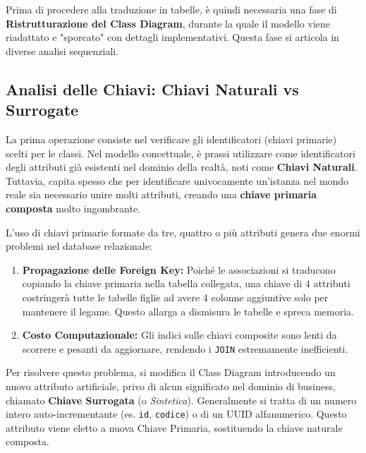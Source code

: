 Prima di procedere alla traduzione in tabelle, è quindi necessaria una fase di \textbf{Ristrutturazione del Class Diagram}, durante la quale il modello viene riadattato e "sporcato" con dettagli implementativi. Questa fase si articola in diverse analisi sequenziali.

\subsection{Analisi delle Chiavi: Chiavi Naturali vs Surrogate}

La prima operazione consiste nel verificare gli identificatori (chiavi primarie) scelti per le classi. Nel modello concettuale, è prassi utilizzare come identificatori degli attributi già esistenti nel dominio della realtà, noti come \textbf{Chiavi Naturali}. 
Tuttavia, capita spesso che per identificare univocamente un'istanza nel mondo reale sia necessario unire molti attributi, creando una \textbf{chiave primaria composta} molto ingombrante.

L'uso di chiavi primarie formate da tre, quattro o più attributi genera due enormi problemi nel database relazionale:
\begin{enumerate}
    \item \textbf{Propagazione delle Foreign Key:} Poiché le associazioni si traducono copiando la chiave primaria nella tabella collegata, una chiave di 4 attributi costringerà tutte le tabelle figlie ad avere 4 colonne aggiuntive solo per mantenere il legame. Questo allarga a dismisura le tabelle e spreca memoria.
    \item \textbf{Costo Computazionale:} Gli indici sulle chiavi composite sono lenti da scorrere e pesanti da aggiornare, rendendo i \texttt{JOIN} estremamente inefficienti.
\end{enumerate}

\medskip

Per risolvere questo problema, si modifica il Class Diagram introducendo un nuovo attributo artificiale, privo di alcun significato nel dominio di business, chiamato \textbf{Chiave Surrogata} (o \textit{Sintetica}).
Generalmente si tratta di un numero intero auto-incrementante (es. \texttt{id}, \texttt{codice}) o di un UUID alfanumerico. Questo attributo viene eletto a nuova Chiave Primaria, sostituendo la chiave naturale composta.

